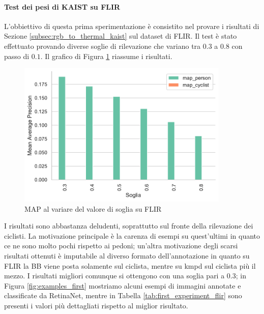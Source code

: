 \paragraph{Test dei pesi di KAIST su FLIR}
L'obbiettivo di questa prima sperimentazione è consistito nel provare i risultati di Sezione \ref{subsec:rgb_to_thermal_kaist} sul dataset di FLIR. Il test è stato effettuato provando diverse soglie di rilevazione che variano tra $0.3$ a $0.8$ con passo di $0.1$. Il grafico di Figura \ref{fig:map_first_flir_lwir} riassume i risultati. 
\begin{figure}[]
    \centering
    \includegraphics[width = 0.9\textwidth]{images/graphic/first_test_lwir_map.pdf}
    \caption{MAP al variare del valore di soglia su FLIR}
    \label{fig:map_first_flir_lwir}
\end{figure}
I risultati sono abbastanza deludenti, soprattutto sul fronte della rilevazione dei ciclisti. La motivazione principale è la carenza di esempi su quest'ultimi in quanto ce ne sono molto pochi rispetto ai pedoni; un'altra motivazione degli scarsi risultati ottenuti è imputabile al diverso formato dell'annotazione in quanto su FLIR la \ac{BB} viene posta solamente sul ciclista, mentre su \ac{kmpd} sul ciclista più il mezzo. I risultati migliori comunque si ottengono con una soglia pari a $0.3$; in Figura \ref{fig:examples_first} mostriamo alcuni esempi di immagini annotate e classificate da RetinaNet, mentre in Tabella \ref{tab:first_experiment_flir} sono presenti i valori più dettagliati rispetto al miglior risultato. 
